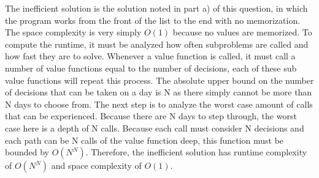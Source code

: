 The inefficient solution is the solution noted in part a) of this question, in which the program works from the front of the list to the end with no memorization. The space complexity is very simply $O(1)$ because no values are memorized.
To compute the runtime, it must be analyzed how often subproblems are called and how fast they are to solve. Whenever a value function is called, it must call a number of value functions equal to the number of decisions, each of these sub value functions will repeat this process. The absolute upper bound on the number of decisions that can be taken on a day is N as there simply cannot be more than N days to choose from. The next step is to analyze the worst case amount of calls that can be experienced. Because there are N days to step through, the worst case here is a depth of N calls. Because each call must consider N decisions and each path can be N calls of the value function deep, this function must be bounded by $O(N^N)$.
Therefore, the inefficient solution has runtime complexity of $O(N^N)$ and space complexity of $O(1)$.

